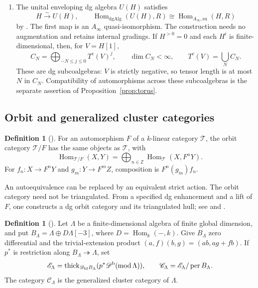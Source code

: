 \documentclass[12pt,a4paper,english,reqno]{amsart}
\theoremstyle{plain}
\theoremstyle{definition}
\newtheorem{dfn*}[thm]{Definition}
\numberwithin{equation}{section}
\def\La{\Lambda}
\def\Hom{\operatorname{Hom}}
\def\thick{\operatorname{thick}}
\def\Db{{\mathcal D}^{\text{\rm b}}}
\def\perf{\operatorname{per}}
\def\calC{{\mathcal C}}
\def\calD{{\mathcal D}}
\def\bbZ{{\mathbb Z}}
\def\iso{\cong}
\def\ds{\oplus}
\def\Ds{\bigoplus}
\def\ya#1{\xrightarrow{#1}}
\def\Ainf{A_\infty}
\def\fd{\mathrm{fd}}
\begin{document}
\begin{enumerate}[label=(\roman*)]
\item The unital enveloping dg algebra $U(H)$ satisfies
\[
 H\ya{\sim}U(H),\qquad
 \Hom_{\mathrm{dgAlg}}(U(H),R)\iso
 \Hom_{\Ainf,\mathrm{su}}(H,R)
\]
by \cite[Proposition 2.1]{COS}. The first map is an $\Ainf$
quasi-isomorphism. The construction needs no augmentation and retains
internal gradings. If $H^{>0}=0$ and each $H^i$ is finite-dimensional,
then, for $V=H[1]$,
\[
 C_N=\Ds_{-N\le j\le0}T^c(V)^j,
 \qquad \dim C_N<\infty,\qquad T^c(V)=\bigcup_N C_N.
\]
These are dg subcoalgebras: $V$ is strictly negative, so tensor length
is at most $N$ in $C_N$. Compatibility of automorphisms across these
subcoalgebras is the separate assertion of Proposition~\ref{prop:torus}.
\end{enumerate}

\subsection{Orbit and generalized cluster categories}\label{subsec:cluster-definitions}

\begin{dfn*}[{\cite[Section 1]{KellerOrbit}}]\label{def:orbit-category}
For an automorphism $F$ of a $k$-linear category $\mathcal T$, the
orbit category $\mathcal T/F$ has the same objects as $\mathcal T$,
with
\[
 \Hom_{\mathcal T/F}(X,Y)=\Ds_{n\in\bbZ}\Hom_{\mathcal T}(X,F^nY).
\]
For $f_n:X\to F^nY$ and $g_m:Y\to F^mZ$, composition is
$F^n(g_m)f_n$.
\end{dfn*}

An autoequivalence can be replaced by an equivalent strict action.
The orbit category need not be triangulated. From a specified dg enhancement and a lift of $F$, one constructs
a dg orbit category and its triangulated hull;
see \cite[Sections 4--5]{KellerOrbit} and \cite{KellerOrbitCorr}.

\begin{dfn*}[{\cite[Section 4.1]{Amiot}}]\label{def:generalized-cluster}
Let $\La$ be a finite-dimensional algebra of finite global dimension,
and put $B_\La=\La\ds D\La[-3]$, where $D=\Hom_k(-,k)$.
Give $B_\La$ zero differential and the trivial-extension product
$(a,f)(b,g)=(ab,ag+fb)$. If $p^*$ is restriction along
$B_\La\twoheadrightarrow\La$, set
\[
 \mathcal E_\La=
 \thick_{\calD_{\fd}B_\La}(p^*\Db(\operatorname{mod}\La)),
 \qquad \calC_\La=\mathcal E_\La/\perf B_\La.
\]
The category $\calC_\La$ is the generalized cluster category of $\La$.
\end{dfn*}
\end{document}
